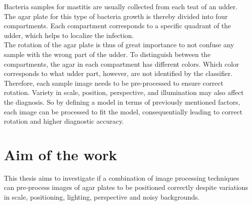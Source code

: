 \noindent Bacteria samples for mastitis are usually collected from each teat of an udder. The agar plate for this type of bacteria growth is thereby divided into four compartments. Each compartment corresponds to a specific quadrant of the udder, which helps to localize the infection. \\

\noindent The rotation of the agar plate is thus of great importance to not confuse any sample with the wrong part of the udder. To distinguish between the compartments, the agar in each compartment has different colors. Which color corresponds to what udder part, however, are not identified by the classifier.\\

\noindent Therefore, each sample image needs to be pre-processed to ensure correct rotation. Variety in scale, position, perspective, and illumination may also affect the diagnosis. So by defining a model in terms of previously mentioned factors, each image can be processed to fit the model, consequentially leading to correct rotation and higher diagnostic accuracy.




\section{Aim of the work}
This thesis aims to investigate if a combination of image processing techniques can pre-process images of agar plates to be positioned correctly despite variations in scale, positioning, lighting, perspective and noisy backgrounds. 

